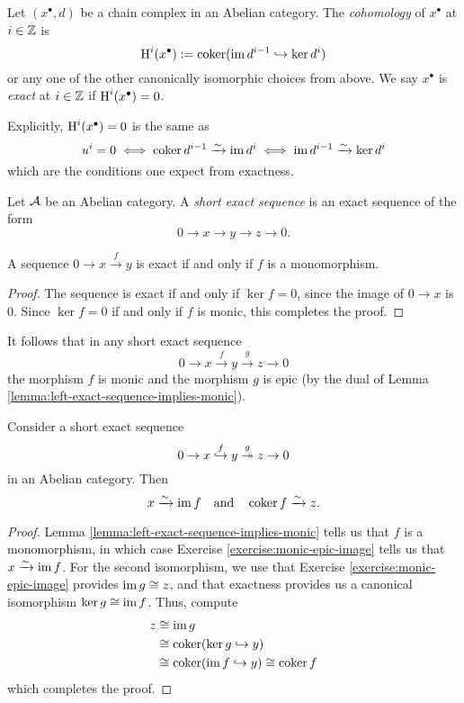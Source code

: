 \begin{definition}
	Let \((x^\bullet,d)\) be a chain complex in an Abelian category. The \emph{cohomology} of \(x^\bullet\) at \(i\in\mathbb{Z}\) is
	\[ \operatorname{H}^i(x^\bullet) := \operatorname{coker}(\operatorname{im}{d^{i-1}}\hookrightarrow\ker{d^{i}}) \]
	or any one of the other canonically isomorphic choices from above. We say \(x^\bullet\) is \emph{exact} at \(i\in\mathbb{Z}\) if \(\operatorname{H}^i(x^\bullet) = 0\).
\end{definition}
\begin{remark}
	Explicitly, \(\operatorname{H}^i(x^\bullet) = 0\) is the same as
	\[ u^i = 0 \iff \operatorname{coker}{d^{i-1}} \xrightarrow{\sim} \operatorname{im}{d^i} \iff \operatorname{im}{d^{i-1}}\xrightarrow{\sim}\ker{d^i} \]
	which are the conditions one expect from exactness.
\end{remark}
\begin{definition}
	Let \(\mathcal{A}\) be an Abelian category. A \emph{short exact sequence} is an exact sequence of the form
	\[ 0 \to x \to y \to z \to 0. \]
\end{definition}
\begin{lemma}\label{lemma:left-exact-sequence-implies-monic}
	A sequence \(0 \to x \overset{f}\to y\) is exact if and only if \(f\) is a monomorphism.
\end{lemma}
\begin{proof}
The sequence is exact if and only if \(\ker{f} = 0\), since the image of \(0\to x\) is \(0\). Since \(\ker{f}=0\) if and only if \(f\) is
monic, this completes the proof.
\end{proof}
\begin{remark}
	It follows that in any short exact sequence
	\[ 0\to x\overset{f}\to y\overset{g}\to z\to 0 \]
	the morphism \(f\) is monic and the morphism \(g\) is epic (by the dual of Lemma \ref{lemma:left-exact-sequence-implies-monic}).
\end{remark}
\begin{theorem}
	Consider a short exact sequence
	\[ 0\to x\overset{f}{\hookrightarrow} y\overset{g}{\twoheadrightarrow} z\to 0 \]
	in an Abelian category. Then
	\[ x\xrightarrow{\sim}\operatorname{im}{f}\quad\text{and}\quad\operatorname{coker}{f}\xrightarrow{\sim} z. \]
\end{theorem}
\begin{proof}
Lemma \ref{lemma:left-exact-sequence-implies-monic} tells us that \(f\) is a monomorphism, in which case Exercise \ref{exercise:monic-epic-image} tells us that
\(x\xrightarrow{\sim}\operatorname{im}{f}\). For the second isomorphism, we use that Exercise \ref{exercise:monic-epic-image} provides \(\operatorname{im}{g}\cong z\), and that exactness provides us a canonical isomorphism \(\ker{g}\cong\operatorname{im}{f}\).
Thus, compute
\begin{align*}
	z &\cong \operatorname{im}{g} \\
	&\cong \operatorname{coker}(\ker{g}\hookrightarrow y) \\
	&\cong \operatorname{coker}(\operatorname{im}{f}\hookrightarrow y) \cong \operatorname{coker}{f}
\end{align*}
which completes the proof.
\end{proof}

